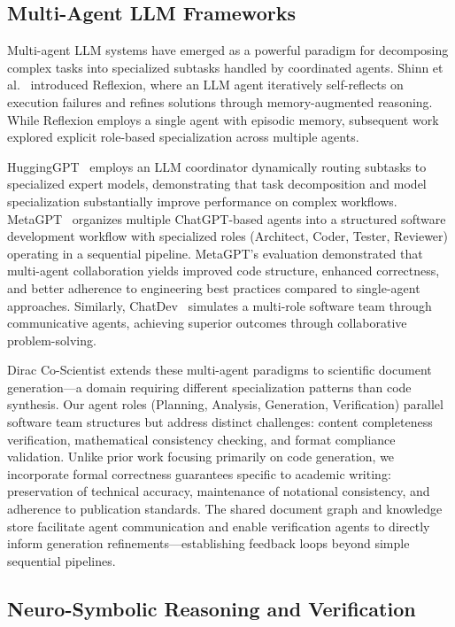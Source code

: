 \documentclass{ieeeaccess}
\begin{document}
\subsection{Multi-Agent LLM Frameworks}

Multi-agent LLM systems have emerged as a powerful paradigm for decomposing complex tasks into specialized subtasks handled by coordinated agents. Shinn et al.~\cite{shinn2023reflexion} introduced Reflexion, where an LLM agent iteratively self-reflects on execution failures and refines solutions through memory-augmented reasoning. While Reflexion employs a single agent with episodic memory, subsequent work explored explicit role-based specialization across multiple agents.

HuggingGPT~\cite{shen2023hugginggpt} employs an LLM coordinator dynamically routing subtasks to specialized expert models, demonstrating that task decomposition and model specialization substantially improve performance on complex workflows. MetaGPT~\cite{hong2024metagpt} organizes multiple ChatGPT-based agents into a structured software development workflow with specialized roles (Architect, Coder, Tester, Reviewer) operating in a sequential pipeline. MetaGPT's evaluation demonstrated that multi-agent collaboration yields improved code structure, enhanced correctness, and better adherence to engineering best practices compared to single-agent approaches. Similarly, ChatDev~\cite{qian2023communicative} simulates a multi-role software team through communicative agents, achieving superior outcomes through collaborative problem-solving.

Dirac Co-Scientist extends these multi-agent paradigms to scientific document generation—a domain requiring different specialization patterns than code synthesis. Our agent roles (Planning, Analysis, Generation, Verification) parallel software team structures but address distinct challenges: content completeness verification, mathematical consistency checking, and format compliance validation. Unlike prior work focusing primarily on code generation, we incorporate formal correctness guarantees specific to academic writing: preservation of technical accuracy, maintenance of notational consistency, and adherence to publication standards. The shared document graph and knowledge store facilitate agent communication and enable verification agents to directly inform generation refinements—establishing feedback loops beyond simple sequential pipelines.

\subsection{Neuro-Symbolic Reasoning and Verification}
\end{document}
